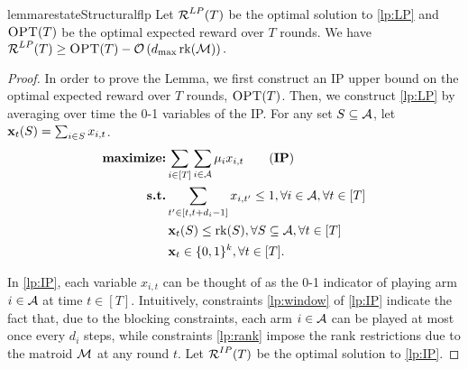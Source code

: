 \begin{restatable}{lemma}{restateStructuralflp}\label{lem:structural:flp}
Let $\operatorname{\mathcal{R}}^{LP}(T)$ be the optimal solution to \eqref{lp:LP} and $\textsc{OPT}(T)$ be the optimal expected reward over $T$ rounds. We have
$
\operatorname{\mathcal{R}}^{LP}(T) \geq \textsc{OPT}(T) - \mathcal{O}\left(d_{\max} \operatorname{rk}(\operatorname{\mathcal{M}})\right).
$
\end{restatable}
\begin{proof}
In order to prove the Lemma, we first construct an IP upper bound on the optimal expected reward over $T$ rounds, $\textsc{OPT}(T)$. Then, we construct \eqref{lp:LP} by averaging over time the 0-1 variables of the IP. For any set $S \subseteq \operatorname{\mathcal{A}}$, let $\operatorname{\mathbf{x}}_t(S) = \sum_{i \in S} x_{i,t}$. 
\begin{align}
\textbf{maximize:}& \sum_{i \in [T]} \sum_{i \in \A} \mu_{i} x_{i,t} \tag{\textbf{IP}} \label{lp:IP}\\
\textbf{s.t.}& \sum_{t' \in [t,t+d_i-1]} x_{i,t'} \leq 1, \forall i \in \A, \forall t \in [T] \label{lp:window} \\
\qquad & \x_t(S) \leq \rk(S), \forall S\subseteq \A, \forall t \in [T] \label{lp:rank} \\
\qquad & \x_{t} \in \{0,1\}^k, \forall t \in [T]. \notag
\end{align}

In \eqref{lp:IP}, each variable $x_{i,t}$ can be thought of as the 0-1 indicator of playing arm $i\in \operatorname{\mathcal{A}}$ at time $t \in [T]$. Intuitively, constraints \eqref{lp:window} of \eqref{lp:IP} indicate the fact that, due to the blocking constraints, each arm $i \in \operatorname{\mathcal{A}}$ can be played at most once every $d_i$ steps, while constraints \eqref{lp:rank} impose the rank restrictions due to the matroid $\operatorname{\mathcal{M}}$ at any round $t$. Let $\operatorname{\mathcal{R}}^{IP}(T)$ be the optimal solution to \eqref{lp:IP}.


\end{proof}
